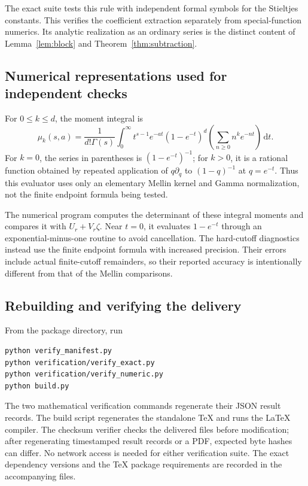 \documentclass[11pt,letterpaper]{article}
\numberwithin{equation}{section}
\theoremstyle{definition}\newtheorem{definition}[theorem]{Definition}
\theoremstyle{remark}\newtheorem{remark}[theorem]{Remark}
\newcommand{\dd}{\,\mathrm d}
\begin{document}
The exact suite tests this rule with independent formal symbols for the
Stieltjes constants. This verifies the coefficient extraction separately
from special-function numerics. Its analytic realization as an ordinary
series is the distinct content of Lemma~\ref{lem:block} and
Theorem~\ref{thm:subtraction}.

\subsection{Numerical representations used for independent checks}
For $0\le k\le d$, the moment integral is
\begin{equation}\label{eq:mellin-check}
 \mu_k(s,a)=\frac1{d!\Gamma(s)}\int_0^\infty
       t^{s-1}e^{-at}(1-e^{-t})^d
       \left(\sum_{n\ge0}n^k e^{-nt}\right)\dd t.
\end{equation}
For $k=0$, the series in parentheses is $(1-e^{-t})^{-1}$;
for $k>0$, it is a rational function obtained by repeated application
of $q\partial_q$ to $(1-q)^{-1}$ at $q=e^{-t}$. Thus this evaluator
uses only an elementary Mellin kernel and Gamma normalization, not the
finite endpoint formula being tested.

The numerical program computes the determinant of these integral moments
and compares it with $U_r+V_r\zeta$. Near $t=0$, it evaluates
$1-e^{-t}$ through an exponential-minus-one routine to avoid cancellation.
The hard-cutoff diagnostics instead use the finite endpoint formula with
increased precision. Their errors include actual finite-cutoff remainders,
so their reported accuracy is intentionally different from that of the
Mellin comparisons.

\subsection{Rebuilding and verifying the delivery}
From the package directory, run
\begin{verbatim}
python verify_manifest.py
python verification/verify_exact.py
python verification/verify_numeric.py
python build.py
\end{verbatim}
The two mathematical verification commands regenerate their JSON result records. The build
script regenerates the standalone TeX and runs the LaTeX compiler. The
checksum verifier checks the delivered files before modification; after
regenerating timestamped result records or a PDF, expected byte hashes
can differ. No network access is needed for either verification suite.
The exact dependency versions and the TeX package requirements are
recorded in the accompanying files.
\end{document}
